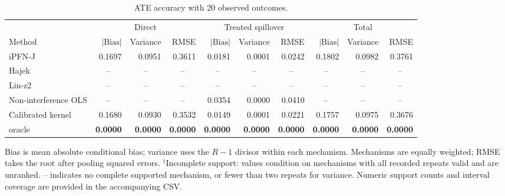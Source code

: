\begin{table}[tb]
\centering
\caption{ATE accuracy with 20 observed outcomes.}
\begingroup\footnotesize
\setlength{\tabcolsep}{3pt}
\begin{tabular*}{\linewidth}{@{\extracolsep{\fill}}l*{9}{r}@{}}
\toprule
&\multicolumn{3}{c}{Direct}&\multicolumn{3}{c}{Treated spillover}&\multicolumn{3}{c}{Total}\\
\cmidrule(lr){2-4}\cmidrule(lr){5-7}\cmidrule(lr){8-10}
Method&$|\mathrm{Bias}|$&Variance&RMSE&$|\mathrm{Bias}|$&Variance&RMSE&$|\mathrm{Bias}|$&Variance&RMSE\\
\midrule
iPFN-J & \cellcolor{blue!11}0.1697 & \cellcolor{blue!11}0.0951 & \cellcolor{blue!11}0.3611 & \cellcolor{blue!11}0.0181 & \cellcolor{blue!11}0.0001 & \cellcolor{blue!11}0.0242 & \cellcolor{blue!11}0.1802 & \cellcolor{blue!11}0.0982 & \cellcolor{blue!11}0.3761 \\
Hajek & \multicolumn{1}{c}{--} & \multicolumn{1}{c}{--} & \multicolumn{1}{c}{--} & \multicolumn{1}{c}{--} & \multicolumn{1}{c}{--} & \multicolumn{1}{c}{--} & \multicolumn{1}{c}{--} & \multicolumn{1}{c}{--} & \multicolumn{1}{c}{--} \\
Lin-z2 & \multicolumn{1}{c}{--} & \multicolumn{1}{c}{--} & \multicolumn{1}{c}{--} & \multicolumn{1}{c}{--} & \multicolumn{1}{c}{--} & \multicolumn{1}{c}{--} & \multicolumn{1}{c}{--} & \multicolumn{1}{c}{--} & \multicolumn{1}{c}{--} \\
Non-interference OLS & \multicolumn{1}{c}{--} & \multicolumn{1}{c}{--} & \multicolumn{1}{c}{--} & \cellcolor{blue!7}0.0354 & \cellcolor{blue!17}0.0000 & \cellcolor{blue!7}0.0410 & \multicolumn{1}{c}{--} & \multicolumn{1}{c}{--} & \multicolumn{1}{c}{--} \\
Calibrated kernel & \cellcolor{blue!17}0.1680 & \cellcolor{blue!17}0.0930 & \cellcolor{blue!17}0.3532 & \cellcolor{blue!17}0.0149 & \cellcolor{blue!7}0.0001 & \cellcolor{blue!17}0.0221 & \cellcolor{blue!17}0.1757 & \cellcolor{blue!17}0.0975 & \cellcolor{blue!17}0.3676 \\
oracle & \cellcolor{blue!24}\textbf{0.0000} & \cellcolor{blue!24}\textbf{0.0000} & \cellcolor{blue!24}\textbf{0.0000} & \cellcolor{blue!24}\textbf{0.0000} & \cellcolor{blue!24}\textbf{0.0000} & \cellcolor{blue!24}\textbf{0.0000} & \cellcolor{blue!24}\textbf{0.0000} & \cellcolor{blue!24}\textbf{0.0000} & \cellcolor{blue!24}\textbf{0.0000} \\
\bottomrule
\end{tabular*}\endgroup
\vspace{3pt}
\begin{minipage}{\linewidth}\scriptsize
Bias is mean absolute conditional bias; variance uses the $R-1$ divisor within each mechanism.
Mechanisms are equally weighted; RMSE takes the root after pooling squared errors.
$^{\dagger}$Incomplete support: values condition on mechanisms with all recorded repeats valid and are unranked.
-- indicates no complete supported mechanism, or fewer than two repeats for variance.
Numeric support counts and interval coverage are provided in the accompanying CSV.
\end{minipage}
\end{table}

